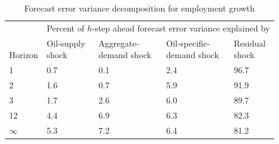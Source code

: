 \begin{table}

\caption{\label{tab:fevd-dempl} Forecast error variance decomposition for employment growth}
\centering
\begin{tabular}[t]{lllll}
\toprule
\multicolumn{1}{c}{ } & \multicolumn{4}{c}{Percent of $h$-step ahead forecast error variance explained by} \\
\cmidrule(l{3pt}r{3pt}){2-5}
\makecell[l]{\\Horizon} & \makecell[l]{Oil-supply\\shock} & \makecell[l]{Aggregate-\\demand shock} & \makecell[l]{Oil-specific-\\demand shock} & \makecell[l]{Residual\\shock}\\
\midrule
1 & 0.7 & 0.1 & 2.4 & 96.7\\
2 & 1.6 & 0.7 & 5.9 & 91.9\\
3 & 1.7 & 2.6 & 6.0 & 89.7\\
12 & 4.4 & 6.9 & 6.3 & 82.3\\
$\infty$ & 5.3 & 7.2 & 6.4 & 81.2\\
\bottomrule
\end{tabular}
\end{table}
